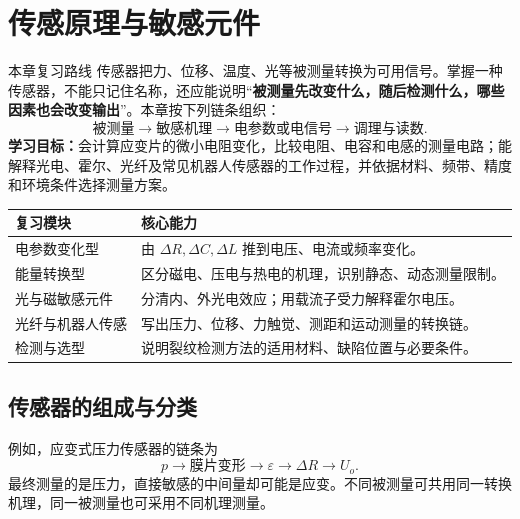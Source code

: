\chapter{传感原理与敏感元件}
\label{chap:sensing-principles}

\begin{focusbox}{本章复习路线}
传感器把力、位移、温度、光等被测量转换为可用信号。掌握一种传感器，不能只记住名称，还应能说明“\textbf{被测量先改变什么，随后检测什么，哪些因素也会改变输出}”。本章按下列链条组织：
\[
\text{被测量}\longrightarrow\text{敏感机理}
\longrightarrow\text{电参数或电信号}\longrightarrow\text{调理与读数}.
\]
\textbf{学习目标：}会计算应变片的微小电阻变化，比较电阻、电容和电感的测量电路；能解释光电、霍尔、光纤及常见机器人传感器的工作过程，并依据材料、频带、精度和环境条件选择测量方案。
\end{focusbox}

\begin{table}[H]
\centering\small
\begin{tabularx}{\linewidth}{@{}p{3cm} X@{}}
\toprule
复习模块 & 核心能力 \\
\midrule
电参数变化型 & 由 $\Delta R,\Delta C,\Delta L$ 推到电压、电流或频率变化。 \\
能量转换型 & 区分磁电、压电与热电的机理，识别静态、动态测量限制。 \\
光与磁敏感元件 & 分清内、外光电效应；用载流子受力解释霍尔电压。 \\
光纤与机器人传感 & 写出压力、位移、力触觉、测距和运动测量的转换链。 \\
检测与选型 & 说明裂纹检测方法的适用材料、缺陷位置与必要条件。 \\
\bottomrule
\end{tabularx}
\end{table}

\section{传感器的组成与分类}


例如，应变式压力传感器的链条为
\[
p\longrightarrow\text{膜片变形}\longrightarrow\varepsilon
\longrightarrow\Delta R\longrightarrow U_o.
\]
最终测量的是压力，直接敏感的中间量却可能是应变。不同被测量可共用同一转换机理，同一被测量也可采用不同机理测量。

